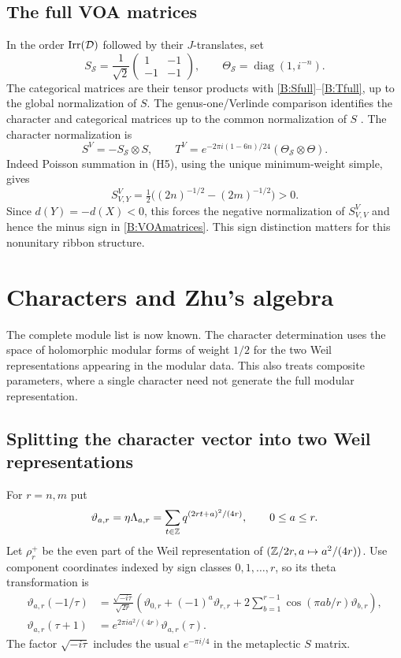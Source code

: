 \documentclass[11pt]{article}
\newcommand{\Scat}{\mathcal S}\newcommand{\U}{\mathcal U}\newcommand{\bo}{\boxtimes}
\numberwithin{equation}{section}
\begin{document}
\subsection{The full VOA matrices}
In the order $\operatorname{Irr}(\mathcal D)$ followed by their $J$-translates, set
\[
 S_{\Scat}=\frac1{\sqrt2}\begin{pmatrix}1&-1\\-1&-1\end{pmatrix},
 \qquad \Theta_{\Scat}=\operatorname{diag}(1,i^{-n}).
\]
The categorical matrices are their tensor products with \eqref{B:Sfull}--\eqref{B:Tfull}, up to the global normalization of $S$. The genus-one/Verlinde comparison identifies the character and categorical matrices up to the common normalization of $S$ \cite{B:Huang}. The character normalization is
\begin{equation}\label{B:VOAmatrices}
 S^V=-S_{\Scat}\otimes S,\qquad
 T^V=e^{-2\pi i(1-6n)/24}(\Theta_{\Scat}\otimes\Theta).
\end{equation}
Indeed Poisson summation in (H5), using the unique minimum-weight simple, gives
\[
 S^V_{V,Y}=\tfrac12\big((2n)^{-1/2}-(2m)^{-1/2}\big)>0.
\]
Since $d(Y)=-d(X)<0$, this forces the negative normalization of $S^V_{V,V}$ and hence the minus sign in \eqref{B:VOAmatrices}. This sign distinction matters for this nonunitary ribbon structure.

\section{Characters and Zhu's algebra}\label{B:sec:characters}
The complete module list is now known. The character determination uses the space of holomorphic modular forms of weight $1/2$ for the two Weil representations appearing in the modular data. This also treats composite parameters, where a single character need not generate the full modular representation.

\subsection{Splitting the character vector into two Weil representations}
For $r=n,m$ put
\[
 \vartheta_{a,r}=\eta\Lambda_{a,r}
 =\sum_{t\in\mathbb Z}q^{(2rt+a)^2/(4r)},\qquad 0\leq a\leq r.
\]
Let $\rho_r^+$ be the even part of the Weil representation of
$(\mathbb Z/2r,a\mapsto a^2/(4r))$. Use component coordinates indexed by sign classes $0,1,\ldots,r$, so its theta transformation is
\begin{align}
 \vartheta_{a,r}(-1/\tau)&=\frac{\sqrt{-i\tau}}{\sqrt{2r}}
 \left(\vartheta_{0,r}+(-1)^a\vartheta_{r,r}
       +2\sum_{b=1}^{r-1}\cos(\pi ab/r)\vartheta_{b,r}\right),\label{B:WeilS}\\
 \vartheta_{a,r}(\tau+1)&=e^{2\pi ia^2/(4r)}\vartheta_{a,r}(\tau).
 \label{B:WeilT}
\end{align}
The factor $\sqrt{-i\tau}$ includes the usual $e^{-\pi i/4}$ in the metaplectic $S$ matrix.
\end{document}
